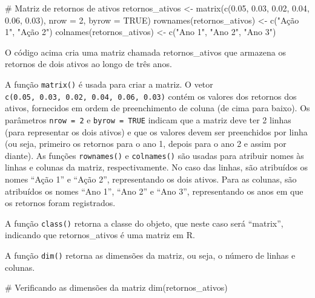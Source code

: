 \documentclass[
  letterpaper,
  DIV=11,
  numbers=noendperiod]{scrreprt}
\newenvironment{Shaded}{\begin{snugshade}}{\end{snugshade}}
\newcommand{\AttributeTok}[1]{\textcolor[rgb]{0.40,0.45,0.13}{#1}}
\newcommand{\CommentTok}[1]{\textcolor[rgb]{0.37,0.37,0.37}{#1}}
\newcommand{\ConstantTok}[1]{\textcolor[rgb]{0.56,0.35,0.01}{#1}}
\newcommand{\DecValTok}[1]{\textcolor[rgb]{0.68,0.00,0.00}{#1}}
\newcommand{\FloatTok}[1]{\textcolor[rgb]{0.68,0.00,0.00}{#1}}
\newcommand{\FunctionTok}[1]{\textcolor[rgb]{0.28,0.35,0.67}{#1}}
\newcommand{\NormalTok}[1]{\textcolor[rgb]{0.00,0.23,0.31}{#1}}
\newcommand{\OtherTok}[1]{\textcolor[rgb]{0.00,0.23,0.31}{#1}}
\newcommand{\StringTok}[1]{\textcolor[rgb]{0.13,0.47,0.30}{#1}}
\begin{document}
\begin{Shaded}
\begin{Highlighting}[]
\CommentTok{\# Matriz de retornos de ativos}
\NormalTok{retornos\_ativos }\OtherTok{\textless{}{-}} \FunctionTok{matrix}\NormalTok{(}\FunctionTok{c}\NormalTok{(}\FloatTok{0.05}\NormalTok{, }\FloatTok{0.03}\NormalTok{, }\FloatTok{0.02}\NormalTok{, }\FloatTok{0.04}\NormalTok{, }\FloatTok{0.06}\NormalTok{, }\FloatTok{0.03}\NormalTok{), }
                          \AttributeTok{nrow =} \DecValTok{2}\NormalTok{, }\AttributeTok{byrow =} \ConstantTok{TRUE}\NormalTok{)}
\FunctionTok{rownames}\NormalTok{(retornos\_ativos) }\OtherTok{\textless{}{-}} \FunctionTok{c}\NormalTok{(}\StringTok{"Ação 1"}\NormalTok{, }\StringTok{"Ação 2"}\NormalTok{)}
\FunctionTok{colnames}\NormalTok{(retornos\_ativos) }\OtherTok{\textless{}{-}} \FunctionTok{c}\NormalTok{(}\StringTok{"Ano 1"}\NormalTok{, }\StringTok{"Ano 2"}\NormalTok{, }\StringTok{"Ano 3"}\NormalTok{)}
\end{Highlighting}
\end{Shaded}

O código acima cria uma matriz chamada retornos\_ativos que armazena os
retornos de dois ativos ao longo de três anos.

A função \texttt{matrix()} é usada para criar a matriz. O vetor
\texttt{c(0.05,\ 0.03,\ 0.02,\ 0.04,\ 0.06,\ 0.03)} contém os valores
dos retornos dos ativos, fornecidos em ordem de preenchimento de coluna
(de cima para baixo). Os parâmetros \texttt{nrow\ =\ 2} e
\texttt{byrow\ =\ TRUE} indicam que a matriz deve ter 2 linhas (para
representar os dois ativos) e que os valores devem ser preenchidos por
linha (ou seja, primeiro os retornos para o ano 1, depois para o ano 2 e
assim por diante). As funções \texttt{rownames()} e \texttt{colnames()}
são usadas para atribuir nomes às linhas e colunas da matriz,
respectivamente. No caso das linhas, são atribuídos os nomes ``Ação 1''
e ``Ação 2'', representando os dois ativos. Para as colunas, são
atribuídos os nomes ``Ano 1'', ``Ano 2'' e ``Ano 3'', representando os
anos em que os retornos foram registrados.

A função \texttt{class()} retorna a classe do objeto, que neste caso
será ``matrix'', indicando que retornos\_ativos é uma matriz em R.

A função \texttt{dim()} retorna as dimensões da matriz, ou seja, o
número de linhas e colunas.

\begin{Shaded}
\begin{Highlighting}[]
\CommentTok{\# Verificando as dimensões da matriz}
\FunctionTok{dim}\NormalTok{(retornos\_ativos)}
\end{Highlighting}
\end{Shaded}
\end{document}
